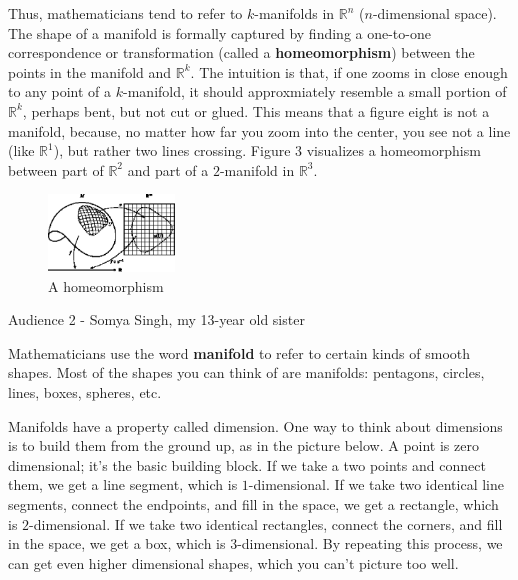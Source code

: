 \documentclass[11pt]{article}
\newcommand{\R}{\mathbb{R}} %
\begin{document}
Thus, mathematicians tend to refer to $k$-manifolds in $\R^n$ ($n$-dimensional
space). The shape of a manifold is formally captured by finding a one-to-one
correspondence or transformation (called a {\bf homeomorphism}) between the
points in the manifold and $\R^k$. The intuition is that, if one zooms in
close enough to any point of a $k$-manifold, it should approxmiately resemble a
small portion of $\R^k$, perhaps bent, but not cut or glued. This means that a
figure eight is not a manifold, because, no matter how far you zoom into the
center, you see not a line (like $\R^1$), but rather two lines crossing. Figure
3 visualizes a homeomorphism between part of $\R^2$ and part of a $2$-manifold
in $\R^3$.
\vspace{-0.2in}
\begin{figure}[h]
\begin{center}
\includegraphics[width=0.3\textwidth]{homeomorphism.eps}
\end{center}
\vspace{-0.2in}
\caption{A homeomorphism}
\label{fig:3}
\end{figure}
\vspace{-0.1in}

\noindent
Audience 2 - Somya Singh, my 13-year old sister

Mathematicians use the word {\bf manifold} to refer to certain kinds of smooth
shapes. Most of the shapes you can think of are manifolds: pentagons, circles,
lines, boxes, spheres, etc.

Manifolds have a property called dimension.
One way to think about dimensions is to build them from the ground up, as in
the picture below. A point is zero dimensional; it's the basic building block.
If we take a two points and connect them, we get a line segment, which is
$1$-dimensional. If we take two identical line segments, connect the endpoints,
and fill in the space, we get a rectangle, which is $2$-dimensional. If we take
two identical rectangles, connect the corners, and fill in the space, we get a
box, which is $3$-dimensional. By repeating this process, we can
get even higher dimensional shapes, which you can't picture too well.
\vspace{-0.1in}
\end{document}
